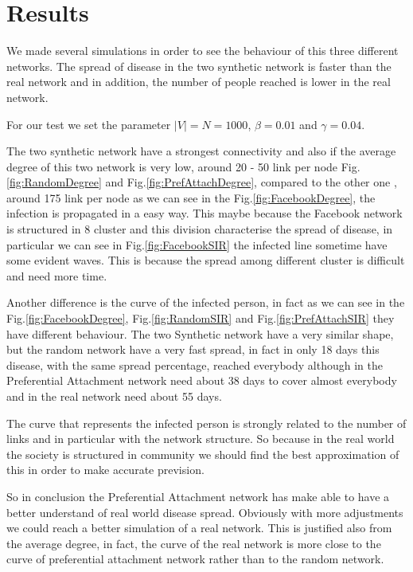 
\section{Results}
    We made several simulations in order to see the behaviour of this three different networks.
    The spread of disease in the two synthetic network is faster than the real network and in addition, the number of people reached is lower in the real network.
    
    For our test we set the parameter $|V|=N=1000$, $\beta = 0.01$ and $\gamma= 0.04$.
    
    The two synthetic network have a strongest connectivity and also if the average degree of this two network is very low, around 20 - 50 link per node Fig.\ref{fig:RandomDegree} and Fig.\ref{fig:PrefAttachDegree}, compared to the other one , around 175 link per node as we can see in the Fig.\ref{fig:FacebookDegree}, the infection is propagated in a easy way.
    This maybe because the Facebook network is structured in 8 cluster and this division characterise the spread of disease, in particular we can see in Fig.\ref{fig:FacebookSIR} the infected line sometime have some evident waves. This is because the spread among different cluster is difficult and need more time.
   
    Another difference is the curve of the infected person, in fact as we can see in the Fig.\ref{fig:FacebookDegree}, Fig.\ref{fig:RandomSIR} and Fig.\ref{fig:PrefAttachSIR} they have different behaviour. The two Synthetic network have a very similar shape, but the random network have a very fast spread, in fact in only 18 days this disease, with the same spread percentage, reached everybody although in the Preferential Attachment network need about 38 days to cover almost everybody and in the real network need about 55 days.
    
    The curve that represents the infected person is strongly related to the number of links and in particular with the network structure. So because in the real world the society is structured in community we should find the best approximation of this in order to make accurate prevision.
    
    So in conclusion the Preferential Attachment network has make able to have a better understand of real world disease spread. Obviously with more adjustments we could reach a better simulation of a real network. This is justified also from the average degree, in fact, the curve of the real network is more close to the curve of preferential attachment network rather than to the random network.
    
